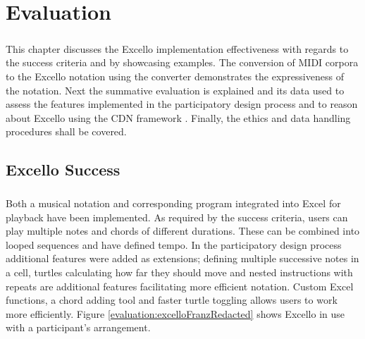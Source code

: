 

\newcommand{\mycbox}[1]{\tikz{\path[draw=#1,fill=#1] (0,0) rectangle (0.3cm,0.3cm);}}

\chapter{Evaluation}

\paragraph{} This chapter discusses the Excello implementation effectiveness with regards to the success criteria and by showcasing examples. The conversion of MIDI corpora to the Excello notation using the converter demonstrates the expressiveness of the notation. Next the summative evaluation is explained and its data used to assess the features implemented in the participatory design process and to reason about Excello using the CDN framework \cite{blackwell:tutorial}. Finally, the ethics and data handling procedures shall be covered.

\section{Excello Success}

\paragraph{} Both a musical notation and corresponding program integrated into Excel for playback have been implemented. As required by the success criteria, users can play multiple notes and chords of different durations. These can be combined into looped sequences and have defined tempo. In the participatory design process additional features were added as extensions; defining multiple successive notes in a cell, turtles calculating how far they should move and nested instructions with repeats are additional features facilitating more efficient notation. Custom Excel functions, a chord adding tool and faster turtle toggling allows users to work more efficiently. Figure \ref{evaluation:excelloFranzRedacted} shows Excello in use with a participant's arrangement.

